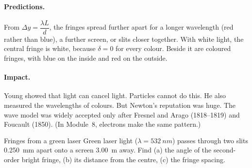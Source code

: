 \paragraph{Predictions.} From $\Delta y = \dfrac{\lambda L}{d}$, the fringes spread
further apart for a longer wavelength (red rather than blue), a further screen, or slits
closer together. With white light, the central fringe is white, because $\delta = 0$ for
every colour. Beside it are coloured fringes, with blue on the inside and red on the
outside.

\paragraph{Impact.} Young showed that light can cancel light. Particles cannot do this.
He also measured the wavelengths of colours. But Newton's reputation was huge. The wave
model was widely accepted only after Fresnel and Arago (1818--1819) and Foucault (1850).
(In Module~8, electrons make the same pattern.)

\begin{workedexample}{Fringes from a green laser}\label{ch2:we:green}
Green laser light ($\lambda = \qty{532}{nm}$) passes through two slits \qty{0.250}{mm}
apart onto a screen \qty{3.00}{m} away. Find (a) the angle of the second-order bright
fringe, (b) its distance from the centre, (c) the fringe spacing.
\end{workedexample}

